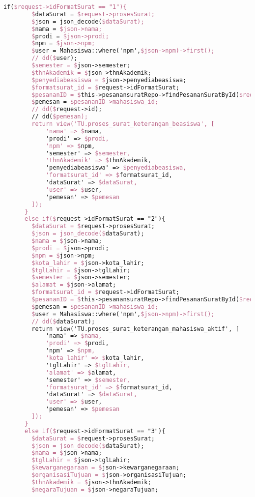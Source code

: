 \begin{lstlisting}[language=tex,basicstyle=\tiny,caption=PesanansuratController.php]
      if($request->idFormatSurat == "1"){
        $dataSurat = $request->prosesSurat;
        $json = json_decode($dataSurat);
        $nama = $json->nama;
        $prodi = $json->prodi;
        $npm = $json->npm;
        $user = Mahasiswa::where('npm',$json->npm)->first();
        // dd($user);
        $semester = $json->semester;
        $thnAkademik = $json->thnAkademik;
        $penyediabeasiswa = $json->penyediabeasiswa;
        $formatsurat_id = $request->idFormatSurat;
        $pesananID = $this->pesanansuratRepo->findPesananSuratById($request->id);
        $pemesan = $pesananID->mahasiswa_id;
        // dd($request->id);
        // dd($pemesan);
        return view('TU.proses_surat_keterangan_beasiswa', [
            'nama' => $nama,
            'prodi' => $prodi,
            'npm' => $npm,
            'semester' => $semester,
            'thnAkademik' => $thnAkademik,
            'penyediabeasiswa' => $penyediabeasiswa,
            'formatsurat_id' => $formatsurat_id,
            'dataSurat' => $dataSurat,
            'user' => $user,
            'pemesan' => $pemesan
        ]);
      }
      else if($request->idFormatSurat == "2"){
        $dataSurat = $request->prosesSurat;
        $json = json_decode($dataSurat);
        $nama = $json->nama;
        $prodi = $json->prodi;
        $npm = $json->npm;
        $kota_lahir = $json->kota_lahir;
        $tglLahir = $json->tglLahir;
        $semester = $json->semester;
        $alamat = $json->alamat;
        $formatsurat_id = $request->idFormatSurat;
        $pesananID = $this->pesanansuratRepo->findPesananSuratById($request->id);
        $pemesan = $pesananID->mahasiswa_id;
        $user = Mahasiswa::where('npm',$json->npm)->first();
        // dd($dataSurat);
        return view('TU.proses_surat_keterangan_mahasiswa_aktif', [
            'nama' => $nama,
            'prodi' => $prodi,
            'npm' => $npm,
            'kota_lahir' => $kota_lahir,
            'tglLahir' => $tglLahir,
            'alamat' => $alamat,
            'semester' => $semester,
            'formatsurat_id' => $formatsurat_id,
            'dataSurat' => $dataSurat,
            'user' => $user,
            'pemesan' => $pemesan
        ]);
      }
      else if($request->idFormatSurat == "3"){
        $dataSurat = $request->prosesSurat;
        $json = json_decode($dataSurat);
        $nama = $json->nama;
        $tglLahir = $json->tglLahir;
        $kewarganegaraan = $json->kewarganegaraan;
        $organisasiTujuan = $json->organisasiTujuan;
        $thnAkademik = $json->thnAkademik;
        $negaraTujuan = $json->negaraTujuan;

\end{lstlisting}
